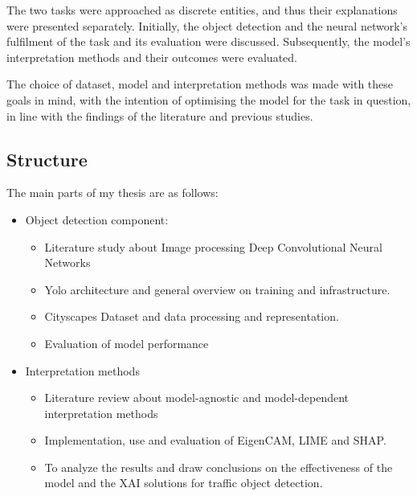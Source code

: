 The two tasks were approached as discrete entities, and thus their explanations were presented separately.
Initially, the object detection and the neural network's fulfilment of the task and its evaluation were discussed.
Subsequently, the model's interpretation methods and their outcomes were evaluated.

The choice of dataset, model and interpretation methods was made with these goals in mind, with the intention of optimising the model for the task in question, in line with the findings of the literature and previous studies.
\subsection{Structure}\label{subsec:Structure} %

The main parts of my thesis are as follows:

\begin{itemize}
    \item Object detection component:
    \begin{itemize}
        \item Literature study about Image processing Deep Convolutional Neural Networks
        \item Yolo architecture and general overview on training and infrastructure.
        \item Cityscapes Dataset and data processing and representation.
        \item Evaluation of model performance
    \end{itemize}
    \item Interpretation methods
    \begin{itemize}
        \item Literature review about model-agnostic and model-dependent interpretation methods
        \item Implementation, use and evaluation of EigenCAM, LIME and SHAP\@.
        \item To analyze the results and draw conclusions on the effectiveness of the model and the XAI solutions for traffic object detection.
    \end{itemize}
\end{itemize}

